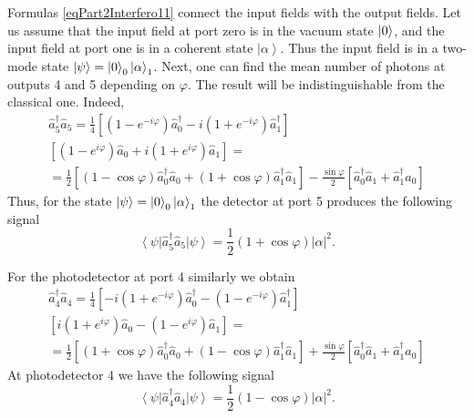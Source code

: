Formulas \eqref{eqPart2Interfero11} connect the input fields with
the output fields. Let us assume that the input field at port zero is in
the vacuum state $\ket{0}$, and the input field at port one is in
a coherent state $\left|\alpha\right>$. Thus the input
field is in a two-mode state $\left|\psi\right> =
\ket{0}_0\left|\alpha\right>_1$. Next, one can find
the mean number of photons at outputs 4 and 5 depending on
$\varphi$. The result will be indistinguishable from the classical one.
Indeed,
\begin{eqnarray}
  \hat{a}_5^{\dag}\hat{a}_5 =
  \frac{1}{4}
  \left[
    \left(1 - e^{-i \varphi}\right)\hat{a}_0^{\dag} -
    i \left(1 + e^{-i \varphi}\right)\hat{a}_1^{\dag}
    \right]
  \nonumber \\
  \left[
    \left(1 - e^{i \varphi}\right)\hat{a}_0 +
    i \left(1 + e^{i \varphi}\right)\hat{a}_1
    \right] = 
  \nonumber \\
  = \frac{1}{2}
  \left[
    \left(
    1 -  \cos \varphi 
    \right)
    \hat{a}_0^{\dag}\hat{a}_0 +
    \left(
    1 +  \cos \varphi 
    \right)
    \hat{a}_1^{\dag}\hat{a}_1
    \right] -
  \frac{\sin \varphi}{2}
  \left[
    \hat{a}_0^{\dag}\hat{a}_1 +
    \hat{a}_1^{\dag}\hat{a}_0
    \right]
  \label{eqPart2InterferoA55}
\end{eqnarray}
Thus, for the state $\left|\psi\right> =
\ket{0}_0\left|\alpha\right>_1$ the detector at port 5 produces
the following signal
\[
\left<\psi\right|\hat{a}^{\dag}_5 \hat{a}_5\left|\psi\right> =
\frac{1}{2}\left(1+\cos \varphi \right) \left|\alpha\right|^2.
\]

For the photodetector at port 4 similarly we obtain
\begin{eqnarray}
  \hat{a}_4^{\dag}\hat{a}_4 =
  \frac{1}{4}
  \left[
    - i \left(1 + e^{-i \varphi}\right)\hat{a}_0^{\dag} -
    \left(1 - e^{-i \varphi}\right)\hat{a}_1^{\dag}
    \right]
  \nonumber \\
  \left[
    i \left(1 + e^{i \varphi}\right)\hat{a}_0 -
    \left(1 - e^{i \varphi}\right)\hat{a}_1
    \right] = 
  \nonumber \\
  = \frac{1}{2}
  \left[
    \left(
    1 +  \cos \varphi 
    \right)
    \hat{a}_0^{\dag}\hat{a}_0 +
    \left(
    1 -  \cos \varphi 
    \right)
    \hat{a}_1^{\dag}\hat{a}_1
    \right] +
  \frac{\sin \varphi}{2}
  \left[
    \hat{a}_0^{\dag}\hat{a}_1 +
    \hat{a}_1^{\dag}\hat{a}_0
    \right]
  \label{eqPart2InterferoA44}
\end{eqnarray}
At photodetector 4 we have
the following signal
\[
\left<\psi\right|\hat{a}^{\dag}_4 \hat{a}_4\left|\psi\right> =
\frac{1}{2}\left(1-\cos \varphi \right) \left|\alpha\right|^2.
\]

